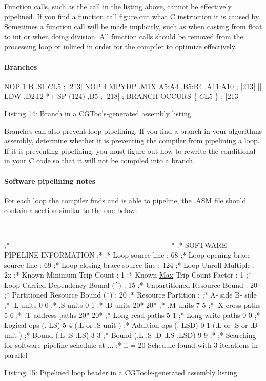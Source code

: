 Function calls, such as the call in the listing above, cannot be effectively pipelined. If you find a function call figure out what C instruction it is caused by. Sometimes a function call will be made implicitly, such as when casting from float to int or when doing division. All function calls should be removed from the processing loop or inlined in order for the compiler to optimize effectively.

\hypertarget{a00362_subsubsection__branches_}{}\paragraph{Branches}\label{a00362_subsubsection__branches_}



\begin{DoxyCode}
    NOP          1
    B     .S1    $C$L5                 ; |213|
    NOP          4
    MPYDP .M1X   A5:A4 ,B5:B4 ,A11:A10 ; |213|
||  LDW   .D2T2  *+ SP (124) ,B5       ; |218|
    ; BRANCH OCCURS \{ $C$L5 \}          ; |213| 
\end{DoxyCode}
  Listing 14\+: Branch in a C\+G\+Tools-\/generated assembly listing

Branches can also prevent loop pipelining. If you find a branch in your algorithm\textquotesingle{}s assembly, determine whether it is preventing the compiler from pipelining a loop. If it is preventing pipelining, you must figure out how to rewrite the conditional in your C code so that it will not be compiled into a branch.

\hypertarget{a00362_subsubsection__software_pipelining_notes_}{}\paragraph{Software pipelining notes}\label{a00362_subsubsection__software_pipelining_notes_}
 For each loop the compiler finds and is able to pipeline, the .A\+S\+M file should contain a section similar to the one below\+:

~


\begin{DoxyCode}
;*--------------------------------------------------------------------*
;* SOFTWARE PIPELINE INFORMATION
;*
;* Loop source line : 68
;* Loop opening brace source line : 69
;* Loop closing brace source line : 124
;* Loop Unroll Multiple : 2x
;* Known Minimum Trip Count : 1
;* Known \hyperlink{a00288_a55ac62cf1b543338c58f8dd0d747c56c}{Max} Trip Count Factor : 1
;* Loop Carried Dependency Bound (^) : 15
;* Unpartitioned Resource Bound : 20
;* Partitioned Resource Bound (*) : 20
;* Resource Partition :
;* A- side B- side
;* .L units 0 0
;* .S units 0 1
;* .D units 20* 20*
;* .M units 7 5
;* .X cross paths 5 6
;* .T address paths 20* 20*
;* Long read paths 5 1
;* Long write paths 0 0
;* Logical ops (. LS) 5 4 (.L or .S unit )
;* Addition ops (. LSD) 0 1 (.L or .S or .D unit )
;* Bound (.L .S .LS) 3 3
;* Bound (.L .S .D .LS .LSD) 9 9
;*
;* Searching \textcolor{keywordflow}{for} software pipeline schedule at ...
;* ii = 20 Schedule found with 3 iterations in parallel 
\end{DoxyCode}
  Listing 15\+: Pipelined loop header in a C\+G\+Tools-\/generated assembly listing

